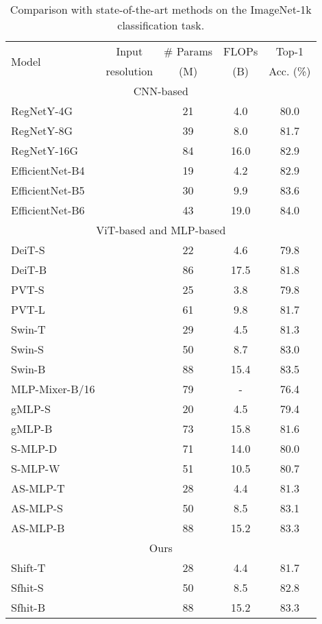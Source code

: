 \documentclass[letterpaper]{article} \usepackage{aaai22}  \usepackage{times}  \usepackage{helvet}  \usepackage{courier}  \usepackage[hyphens]{url}  \usepackage{graphicx} \usepackage{amsmath}
\begin{document}
\begin{table}[]
\centering
\caption{Comparison with state-of-the-art methods on the ImageNet-1k classification task.}
\label{table:classification}
\setlength\tabcolsep{4pt}
\begin{tabular}{@{}l|c|c|c|c@{}}
\toprule
\multirow{2}{*}{Model} & Input & \# Params & FLOPs & Top-1 \\
 & resolution & (M) & (B) & Acc. (\%) \\ \midrule
 \multicolumn{5}{c}{CNN-based} \\ \midrule
 RegNetY-4G &  & 21 & 4.0 & 80.0 \\
 RegNetY-8G &  & 39 & 8.0 & 81.7 \\
 RegNetY-16G &  & 84 & 16.0 & 82.9 \\
 EfficientNet-B4 &  & 19 & 4.2 & 82.9 \\
 EfficientNet-B5 &  & 30 & 9.9 & 83.6 \\
 EfficientNet-B6 &  & 43 & 19.0 & 84.0 \\ \midrule
 \multicolumn{5}{c}{ViT-based and MLP-based} \\ \midrule
 DeiT-S &  & 22 & 4.6 & 79.8 \\
 DeiT-B &  & 86 & 17.5 & 81.8 \\
 PVT-S &  & 25 & 3.8 & 79.8 \\
PVT-L &  & 61 & 9.8 & 81.7 \\
 Swin-T &  & 29 & 4.5 & 81.3 \\
 Swin-S &  & 50 & 8.7 & 83.0 \\
 Swin-B &  & 88 & 15.4 & 83.5 \\ \midrule
MLP-Mixer-B/16 &  & 79 & - & 76.4 \\
 gMLP-S &  & 20 & 4.5 & 79.4 \\
 gMLP-B &  & 73 & 15.8 & 81.6 \\ 
 S-MLP-D &  & 71 & 14.0 & 80.0 \\
 S-MLP-W &  & 51 & 10.5 & 80.7 \\
 AS-MLP-T &  & 28 & 4.4 & 81.3 \\
 AS-MLP-S &  & 50 & 8.5 & 83.1 \\
 AS-MLP-B &  & 88 & 15.2 & 83.3 \\ \midrule
  \multicolumn{5}{c}{Ours} \\ \midrule
 Shift-T &  & 28 & 4.4 & 81.7 \\
 Sfhit-S &  & 50 & 8.5 & 82.8 \\
 Sfhit-B &  & 88 & 15.2 & 83.3 \\ \bottomrule 
\end{tabular}
\end{table}
\end{document}
